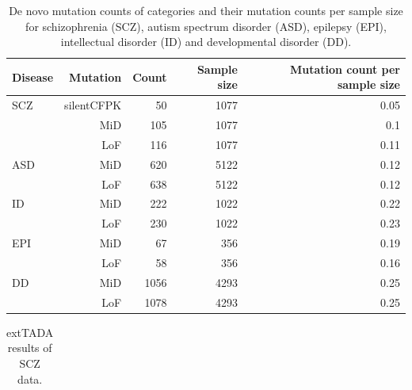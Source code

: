 \documentclass[]{article}
\begin{document}
\begin{table}[H]
\begin{tabular}{l|r|r|r|r}
\hline
Disease & Mutation & Count & Sample size & Mutation count per sample size \\
\hline
SCZ &   silentCFPK & 50 & 1077 & 0.05 \\
   & MiD& 105 & 1077 & 0.1 \\
 &   LoF & 116& 1077 & 0.11 \\
\hline
ASD &   MiD & 620 & 5122 & 0.12 \\
 & LoF & 638 & 5122& 0.12 \\
\hline
ID &   MiD & 222 & 1022 & 0.22 \\
 & LoF & 230 & 1022 & 0.23 \\
\hline
EPI &   MiD & 67 & 356 & 0.19 \\
& LoF & 58 & 356 & 0.16 \\

\hline
DD & MiD &  1056& 4293 & 0.25\\
   & LoF & 1078 & 4293 & 0.25\\
\hline
\end{tabular}
\caption{De novo mutation counts of categories and their mutation
  counts per sample size for schizophrenia (SCZ), autism spectrum disorder
  (ASD), epilepsy (EPI), intellectual disorder (ID) and developmental
  disorder (DD).}
\label{tab:countAndmutationrate}
\end{table}

\begin{table}[H]
\begin{tabular}{l}
\end{tabular}
\caption{extTADA results of SCZ data.}
\label{tab:extTADAforCombinedSCZ}
\end{table}
\end{document}
